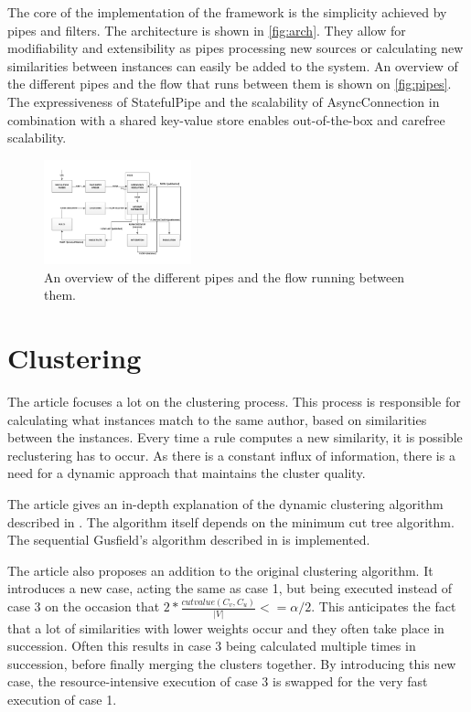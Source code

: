 \documentclass[9pt, twocolumn]{phdsymp} %
\begin{document}
The core of the implementation of the framework is the simplicity achieved by pipes and filters. The architecture is shown in \autoref{fig:arch}. They allow for modifiability and extensibility as pipes processing new sources or calculating new similarities between instances can easily be added to the system. An overview of the different pipes and the flow that runs between them is shown on \autoref{fig:pipes}. The expressiveness of StatefulPipe and the scalability of AsyncConnection in combination with a shared key-value store enables out-of-the-box and carefree scalability.

\begin{figure}[hb!]
	\centering
	\includegraphics[width= 0.38\textwidth]{fig/completepipesmall.pdf}
	\caption{An overview of the different pipes and the flow running between them.}
	\label{fig:pipes}
\end{figure}

\section{Clustering}
The article focuses a lot on the clustering process. This process is responsible for calculating what instances match to the same author, based on similarities between the instances. Every time a rule computes a new similarity, it is possible reclustering has to occur. As there is a constant influx of information, there is a need for a dynamic approach that maintains the cluster quality. 

The article gives an in-depth explanation of the dynamic clustering algorithm described in \cite{dynamic}. The algorithm itself depends on the minimum cut tree algorithm. The sequential Gusfield's algorithm described in \cite{gusfield} is implemented. 

The article also proposes an addition to the original clustering algorithm. It introduces a new case, acting the same as case 1, but being executed instead of case 3 on the occasion that $2 * \frac{cutvalue(C_v, C_u)}{\left|V\right|} <= \alpha / 2$. This anticipates the fact that a lot of similarities with lower weights occur and they often take place in succession. Often this results in case 3 being calculated multiple times in succession, before finally merging the clusters together. By introducing this new case, the resource-intensive execution of case 3 is swapped for the very fast execution of case 1.
\end{document}
